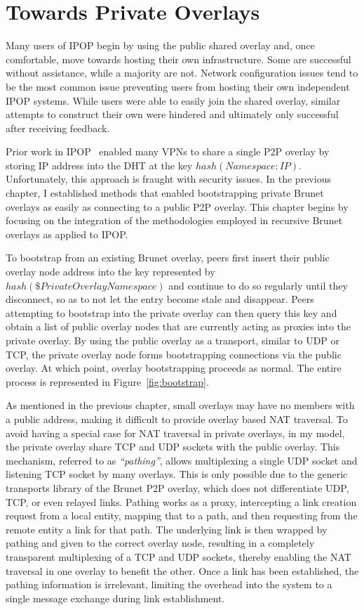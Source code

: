 \section{Towards Private Overlays}
\label{vpn:private_overlays}

Many users of IPOP begin by using the public shared overlay and, once
comfortable, move towards hosting their own infrastructure.  Some are
successful without assistance, while a majority are not.  Network configuration
issues tend to be the most common issue preventing users from hosting their own
independent IPOP systems.  While users were able to easily join the shared
overlay, similar attempts to construct their own were hindered and ultimately
only successful after receiving feedback.

Prior work in IPOP~\cite{pcgrid07} enabled many VPNs to share a single P2P
overlay by storing IP address into the DHT at the key $hash(Namespace:IP)$.
Unfortunately, this approach is fraught with security issues.  In the previous
chapter, I established methods that enabled bootstrapping private Brunet
overlays as easily as connecting to a public P2P overlay.  This chapter begins
by focusing on the integration of the methodologies employed in recursive
Brunet overlays as applied to IPOP.

To bootstrap from an existing Brunet overlay, peers first insert their public
overlay node address into the key represented by $hash(\$Private Overlay
Namespace)$ and continue to do so regularly until they disconnect, so as to not
let the entry become stale and disappear.  Peers attempting to bootstrap into
the private overlay can then query this key and obtain a list of public overlay
nodes that are currently acting as proxies into the private overlay.  By using
the public overlay as a transport, similar to UDP or TCP, the private overlay
node forms bootstrapping connections via the public overlay.  At which point,
overlay bootstrapping proceeds as normal.  The entire process is represented in
Figure~\ref{fig:bootstrap}.

As mentioned in the previous chapter, small overlays may have no members with a
public address, making it difficult to provide overlay based NAT traversal.  To
avoid having a special case for NAT traversal in private overlays, in my model,
the private overlay share TCP and UDP sockets with the public overlay.  This
mechanism, referred to as {\em ``pathing''}, allows multiplexing a single UDP
socket and listening TCP socket by many overlays.  This is only possible due to
the generic transports library of the Brunet P2P overlay, which does not
differentiate UDP, TCP, or even relayed links.  Pathing works as a proxy,
intercepting a link creation request from a local entity, mapping that to a
path, and then requesting from the remote entity a link for that path.  The
underlying link is then wrapped by pathing and given to the correct overlay
node, resulting in a completely transparent multiplexing of a TCP and UDP
sockets, thereby enabling the NAT traversal in one overlay to benefit the
other.  Once a link has been established, the pathing information is
irrelevant, limiting the overhead into the system to a single message exchange
during link establishment.

